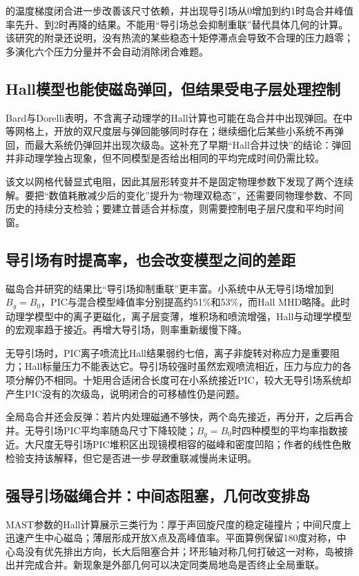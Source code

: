\documentclass[UTF8,a4paper,11pt,openany,fontset=fandol]{ctexbook}
\begin{document}
\citet{Ng2020}的温度梯度闭合进一步改善该尺寸依赖，并出现导引场从0增加到约1时岛合并峰值率先升、到2时再降的结果。不能用“导引场总会抑制重联”替代具体几何的计算。该研究的附录还说明，没有热流的某些稳态十矩停滞点会导致不合理的压力趋零；多演化六个压力分量并不会自动消除闭合难题。

\subsection{Hall模型也能使磁岛弹回，但结果受电子层处理控制}
Bard与Dorelli表明，不含离子动理学的Hall计算也可能在岛合并中出现弹回。在中等网格上，开放的双尺度层与弹回能够同时存在；继续细化后某些小系统不再弹回，而最大系统仍弹回并出现次级岛。这补充了早期“Hall合并过快”的结论：弹回并非动理学独占现象，但不同模型是否给出相同的平均完成时间仍需比较。\citep{L251,Ng2015,Ng2017}

该文以网格代替显式电阻，因此其层形转变并不是固定物理参数下发现了两个连续解。要把“数值耗散减少后的变化”提升为“物理双稳态”，还需要同物理参数、不同历史的持续分支检验；要建立普适合并标度，则需要控制电子层尺度和平均时间窗。

\subsection{导引场有时提高率，也会改变模型之间的差距}
磁岛合并研究\citep{L241}的结果比“导引场抑制重联”更丰富。小系统中从无导引场增加到$B_g=B_0$，PIC与混合模型峰值率分别提高约51\%和53\%，而Hall MHD略降。此时动理学模型中的离子更磁化，离子层变薄，堆积场和喷流增强，Hall与动理学模型的宏观率趋于接近。再增大导引场，则率重新缓慢下降。

无导引场时，PIC离子喷流比Hall结果弱约七倍，离子非旋转对称应力是重要阻力；Hall标量压力不能表达它。导引场较强时虽然宏观喷流相近，压力与应力的各项分解仍不相同。十矩用合适闭合长度可在小系统接近PIC，较大无导引场系统却产生PIC没有的次级岛，说明闭合的可移植性仍是问题。

全局岛合并还会反弹：若片内处理磁通不够快，两个岛先接近，再分开，之后再合并。无导引场PIC平均率随岛尺寸下降较陡；$B_g=B_0$时四种模型的平均率指数接近。大尺度无导引场PIC堆积区出现镜模相容的磁峰和密度凹陷；作者的线性色散检验支持该解释，但它是否进一步\emph{导致}重联减慢尚未证明。

\subsection{强导引场磁绳合并：中间态阻塞，几何改变排岛}
MAST参数的Hall计算展示三类行为：厚于声回旋尺度的稳定碰撞片；中间尺度上迅速产生中心磁岛；薄层形成开放X点及高峰值率。平面算例保留180度对称，中心岛没有优先排出方向，长大后阻塞合并；环形轴对称几何打破这一对称，岛被排出并完成合并。新现象是外部几何可以决定同类局地岛是否终止全局重联。\citep{Stanier2013}
\end{document}
